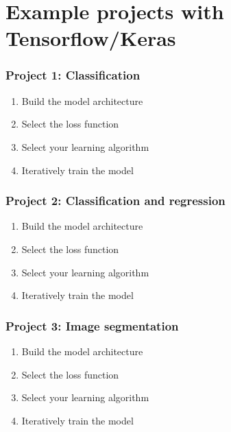 \documentclass{beamer}
\begin{document}
\section{Example projects with Tensorflow/Keras}
\begin{frame}
\frametitle{Project 1: Classification}
\begin{example}
\begin{enumerate}
\item Build the model architecture 
\item Select the loss function
\item Select your learning algorithm
\item Iteratively train the model
\end{enumerate}
\end{example}
\end{frame}

\begin{frame}
\frametitle{Project 2: Classification and regression}
\begin{example}
\begin{enumerate}
\item Build the model architecture 
\item Select the loss function
\item Select your learning algorithm
\item Iteratively train the model
\end{enumerate}
\end{example}
\end{frame}


\begin{frame}
\frametitle{Project 3: Image segmentation}
\begin{example}
\begin{enumerate}
\item Build the model architecture 
\item Select the loss function
\item Select your learning algorithm
\item Iteratively train the model
\end{enumerate}
\end{example}
\end{frame}
\end{document}
